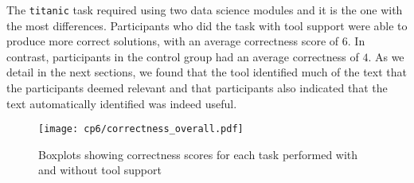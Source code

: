 The \texttt{titanic} task required using two data science modules and it is the one with the most differences. 
Participants who did the task with tool support were able to produce more correct solutions, with an average 
correctness score of $6$. In contrast, participants in the control group had an average correctness of $4$. 
As we detail in the next sections, we found that the tool identified much of the text that the participants deemed relevant
and that participants also indicated that
the text automatically identified was indeed useful.





\begin{figure}
    \centering
    \texttt{[image: cp6/correctness\_overall.pdf]}
    \caption{Boxplots showing correctness scores for each task performed with and without tool support}
    \label{fig:correctness-by-task}
\end{figure}




